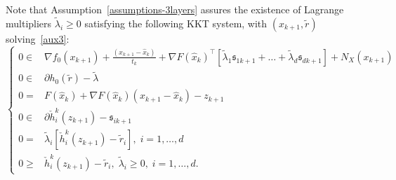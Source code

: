 \documentclass[smallextended,envcountsect]{svjour3}
\newcommand{\col}[1]{\left\{#1\right\}}
\newcommand{\modelh}{\mathfrak{h}}
\begin{document}
Note that
Assumption~\ref{assumptions-3layers} assures the existence of Lagrange multipliers $\tilde \lambda_i\geq 0$ satisfying the following KKT system, with $(x_{k+1},\tilde r)$ solving~\eqref{aux3}:
\begin{equation}\label{KKT}
\left\{
\begin{array}{llll}
0 \in & \displaystyle \nabla f_0(x_{k+1})+ \frac{(x_{k+1}-\hat x_k)}{t_k} + \nabla F(\hat x_k)^\top[\tilde\lambda_1 \mathfrak{ s}_{1k+1}+\ldots+ \tilde\lambda_d\mathfrak{s}_{dk+1}]+ N_X(x_{k+1})\\
0 \in & \partial h_0(\tilde r)-\tilde \lambda\\
0= &F(\hat x_k)+\nabla F(\hat x_k)(x_{k+1}-\hat x_k)-z_{k+1}\\
0 \in &  \partial \check{h}_i^k(z_{k+1})-\mathfrak{s}_{ik+1} \\
0= &\tilde\lambda_i [\check{h}_i^k(z_{k+1})- \tilde r_i] ,\;  i=1,\ldots,d\\
0\geq &\check{h}_i^k(z_{k+1})- \tilde r_i, \; \tilde\lambda_i \geq 0,\;  i=1,\ldots,d.
\end{array}
\right.
\end{equation}
\end{document}
